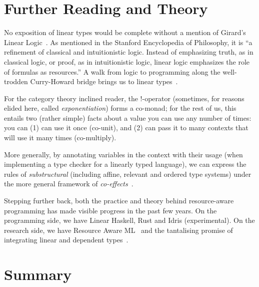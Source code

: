 \section{Further Reading and Theory}\label{sec:further}


No exposition of linear types would be complete without a mention of Girard's
Linear Logic~\cite{girard}. As mentioned in the Stanford Encyclopedia of
Philosophy, it is ``a refinement of classical and intuitionistic logic. Instead
of emphasizing truth, as in classical logic, or proof, as in intuitionistic
logic, linear logic emphasizes the role of formulas as resources.'' A walk from
logic to programming along the well-trodden Curry-Howard bridge brings us to
linear types~\cite{wadler}.

For the category theory inclined reader, the !-operator (sometimes, for reasons
elided here, called \emph{exponentiation}) forms a co-monad; for the rest of
us, this entails two (rather simple) facts about a value you can use any number
of times: you can (1) can use it once (co-unit), and (2) can pass it to many
contexts that will use it many times (co-multiply).

More generally, by annotating variables in the context with their usage (when
implementing a type checker for a linearly typed language), we can express the
rules of \emph{substructural} (including affine, relevant and ordered type
systems) under the more general framework of \emph{co-effects}~\cite{petricek}.

Stepping further back, both the practice and theory behind resource-aware
programming has made visible progress in the past few years.  On the
programming side, we have Linear Haskell, Rust and Idris (experimental). On the
research side, we have Resource Aware ML~\cite{hoffmann} and the tantalising
promise of integrating linear and dependent types~\cite{atkey}.

\section{Summary}

